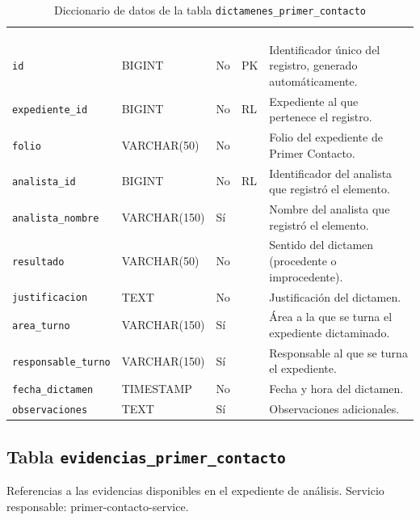 \footnotesize
\renewcommand{\arraystretch}{1.15}
\setlength{\tabcolsep}{4pt}
\begin{longtable}{|L{3.9cm}|L{2.4cm}|L{0.9cm}|L{1.2cm}|L{6.6cm}|}
	\hiderowcolors\caption{Diccionario de datos de la tabla \texttt{dictamenes\_primer\_contacto}}
	\label{tab:dic_dictamenes_primer_contacto} \\ \showrowcolors
	\hline
	 &  &  &  &  \\
	\hline
	\endfirsthead
	\hline
	 &  &  &  &  \\
	\hline
	\endhead
		\texttt{id} & BIGINT & No & PK & Identificador único del registro, generado automáticamente. \\ \hline
		\texttt{expediente\_\allowbreak{}id} & BIGINT & No & RL & Expediente al que pertenece el registro. \\ \hline
		\texttt{folio} & VARCHAR(50) & No &  & Folio del expediente de Primer Contacto. \\ \hline
		\texttt{analista\_\allowbreak{}id} & BIGINT & No & RL & Identificador del analista que registró el elemento. \\ \hline
		\texttt{analista\_\allowbreak{}nombre} & VARCHAR(150) & Sí &  & Nombre del analista que registró el elemento. \\ \hline
		\texttt{resultado} & VARCHAR(50) & No &  & Sentido del dictamen (procedente o improcedente). \\ \hline
		\texttt{justificacion} & TEXT & No &  & Justificación del dictamen. \\ \hline
		\texttt{area\_\allowbreak{}turno} & VARCHAR(150) & Sí &  & Área a la que se turna el expediente dictaminado. \\ \hline
		\texttt{responsable\_\allowbreak{}turno} & VARCHAR(150) & Sí &  & Responsable al que se turna el expediente. \\ \hline
		\texttt{fecha\_\allowbreak{}dictamen} & TIMESTAMP & No &  & Fecha y hora del dictamen. \\ \hline
		\texttt{observaciones} & TEXT & Sí &  & Observaciones adicionales. \\ \hline
\end{longtable}
\normalsize
\setlength{\tabcolsep}{6pt}
\renewcommand{\arraystretch}{1}

\subsection{Tabla \texttt{evidencias\_primer\_contacto}}
Referencias a las evidencias disponibles en el expediente de análisis. Servicio responsable: primer-contacto-service.


